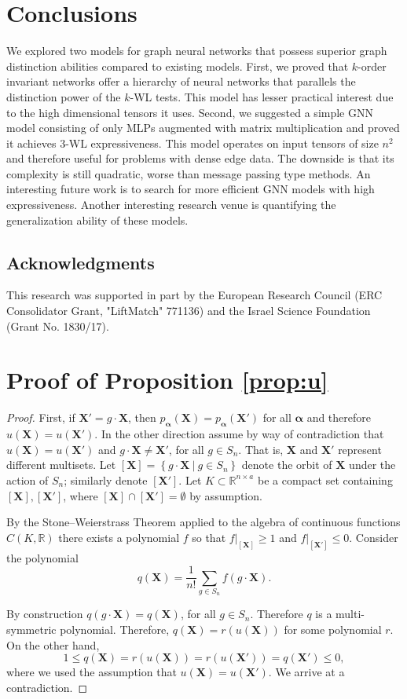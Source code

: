 \documentclass{article}
\newcommand{\set}[1]{\left\{#1\right\}}
\newcommand{\Real}{\mathbb R}
\def\valpha{{\bm{\alpha}}}
\def\mX{{\bm{X}}}
\begin{document}
\section{Conclusions}
We explored two models for graph neural networks that possess superior graph distinction abilities compared to existing models. First, we proved that $k$-order invariant networks offer a hierarchy of neural networks that parallels the distinction power of the $k$-WL tests. This model has lesser practical interest due to the high dimensional tensors it uses. Second, we suggested a simple GNN model consisting of only MLPs augmented with matrix multiplication and proved it achieves $3$-WL expressiveness. 
This model operates on input tensors of size $n^2$ and therefore useful for problems with dense edge data. The downside is that its complexity is still quadratic, worse than message passing type methods. An interesting future work is to search for more efficient GNN models with high expressiveness. Another interesting research venue is quantifying the generalization ability of these models. 

\subsection*{Acknowledgments}
This research was supported in part by the European Research Council (ERC Consolidator Grant, "LiftMatch" 771136) and the Israel Science Foundation (Grant No. 1830/17).



\appendix
\section{Proof of Proposition \ref{prop:u}} \label{app:prop1}
\begin{proof}
First, if $\mX'=g\cdot \mX$, then $p_\valpha(\mX)=p_\valpha(\mX')$ for all $\valpha$ and therefore $u(\mX)=u(\mX')$. In the other direction assume by way of contradiction that $u(\mX)=u(\mX')$ and $g\cdot \mX \ne \mX'$, for all $g\in S_n$. That is, $\mX$ and $\mX'$ represent different multisets. 
Let $[\mX]=\set{g\cdot \mX \ \vert \ g\in S_n}$ denote the orbit of $\mX$ under the action of $S_n$; similarly denote $[\mX']$. Let $K\subset \Real^{n\times a}$ be a compact set containing $[\mX],[\mX']$, where $[\mX]\cap [\mX'] = \emptyset$ by assumption. 

By the Stone–Weierstrass Theorem applied to the algebra of continuous functions $C(K,\Real)$ there exists a polynomial $f$ so that $f\vert_{[\mX]}\geq 1$ and $f\vert_{[\mX']}\leq 0$.  Consider the polynomial $$q(\mX)=\frac{1}{n!}\sum_{g\in S_n} f(g\cdot \mX).$$ 

By construction $q(g\cdot \mX)=q(\mX)$, for all $g\in S_n$. Therefore $q$ is a multi-symmetric polynomial. Therefore, $q(\mX)=r(u(\mX))$ for some polynomial $r$.
On the other hand, $$1\leq q(\mX) = r(u(\mX)) = r(u(\mX')) = q(\mX') \leq 0,$$ where we used the assumption that $u(\mX)=u(\mX')$. We arrive at a contradiction.
\end{proof}
\end{document}

